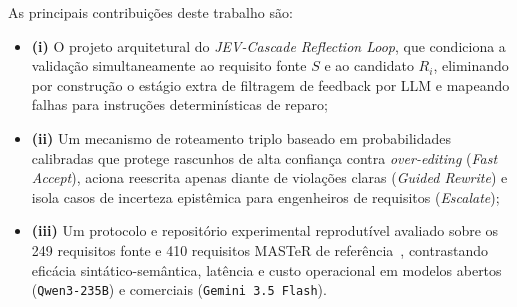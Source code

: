 As principais contribuições deste trabalho são:
\begin{itemize}
    \item \textbf{(i)} O projeto arquitetural do \textit{JEV-Cascade Reflection Loop}, que condiciona a validação simultaneamente ao requisito fonte $S$ e ao candidato $R_i$, eliminando por construção o estágio extra de filtragem de feedback por LLM e mapeando falhas para instruções determinísticas de reparo;
    \item \textbf{(ii)} Um mecanismo de roteamento triplo baseado em probabilidades calibradas que protege rascunhos de alta confiança contra \textit{over-editing} (\textit{Fast Accept}), aciona reescrita apenas diante de violações claras (\textit{Guided Rewrite}) e isola casos de incerteza epistêmica para engenheiros de requisitos (\textit{Escalate});
    \item \textbf{(iii)} Um protocolo e repositório experimental reprodutível avaliado sobre os 249 requisitos fonte e 410 requisitos MASTeR de referência~\cite{grosser2023comparative, rosskothen2026zenodo}, contrastando eficácia sintático-semântica, latência e custo operacional em modelos abertos (\texttt{Qwen3-235B}) e comerciais (\texttt{Gemini 3.5 Flash}).
\end{itemize}
